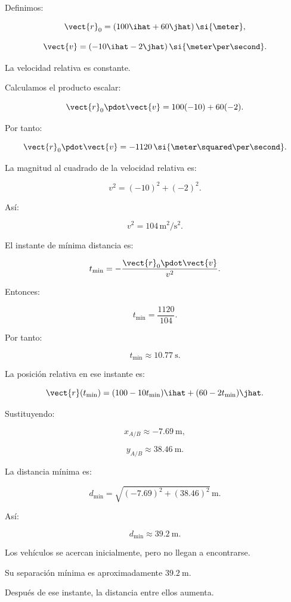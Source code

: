 Definimos:

\[
\vect{r}_0
=
(100\ihat+60\jhat)\,\si{\meter},
\]

\[
\vect{v}
=
(-10\ihat-2\jhat)\,
\si{\meter\per\second}.
\]

La velocidad relativa es constante.

Calculamos el producto escalar:

\[
\vect{r}_0\pdot\vect{v}
=
100(-10)+60(-2).
\]

Por tanto:

\[
\vect{r}_0\pdot\vect{v}
=
-1120\,
\si{\meter\squared\per\second}.
\]

La magnitud al cuadrado de la velocidad relativa es:

\[
v^2=(-10)^2+(-2)^2.
\]

Así:

\[
v^2
=
104\,\si{\meter\squared\per\second\squared}.
\]

El instante de mínima distancia es:

\[
t_{\min}
=
-\frac{\vect{r}_0\pdot\vect{v}}{v^2}.
\]

Entonces:

\[
t_{\min}=\frac{1120}{104}.
\]

Por tanto:

\[
\boxed{
t_{\min}\approx\SI{10.77}{\second}
}.
\]

La posición relativa en ese instante es:

\[
\vect{r}(t_{\min})
=
(100-10t_{\min})\ihat
+
(60-2t_{\min})\jhat.
\]

Sustituyendo:

\[
x_{A/B}\approx-\SI{7.69}{\meter},
\]

\[
y_{A/B}\approx\SI{38.46}{\meter}.
\]

La distancia mínima es:

\[
d_{\min}
=
\sqrt{
(-7.69)^2+(38.46)^2
}\,\si{\meter}.
\]

Así:

\[
\boxed{
d_{\min}\approx\SI{39.2}{\meter}
}.
\]

\begin{interpretacion}

Los vehículos se acercan inicialmente,
pero no llegan a encontrarse.

Su separación mínima es aproximadamente
\(\SI{39.2}{\meter}\).

Después de ese instante, la distancia
entre ellos aumenta.

\end{interpretacion}


